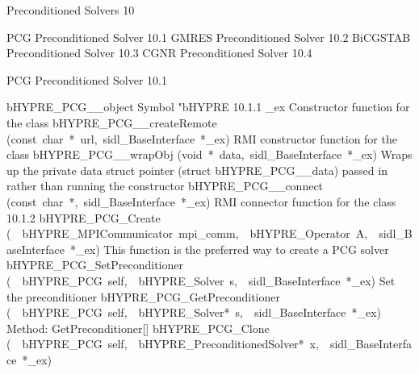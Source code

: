 \documentclass{article}
\begin{document}
\begin{cxxentry}
{}
        {Preconditioned Solvers}
        {}
        {
}
        {10}
\begin{cxxnames}
\cxxitem{}
        {PCG Preconditioned Solver}
        {}
        {
}
        {10.1}
\cxxitem{}
        {GMRES Preconditioned Solver}
        {}
        {
}
        {10.2}
\cxxitem{}
        {BiCGSTAB Preconditioned Solver}
        {}
        {
}
        {10.3}
\cxxitem{}
        {CGNR Preconditioned Solver}
        {}
        {
}
        {10.4}
\end{cxxnames}
\begin{cxxentry}
{}
        {PCG Preconditioned Solver}
        {}
        {
}
        {10.1}
\begin{cxxnames}
        {bHYPRE\_PCG\_\_object}
        {}
        {
Symbol "bHYPRE}
        {10.1.1}
        {\_ex}
        {}
        {
Constructor function for the class}
        {}
\label{cxx.10.1.11}
        {bHYPRE\_PCG\_\_createRemote}
        {(const\ char\ *\ url,\ sidl\_BaseInterface\ *\_ex)}
        {
RMI constructor function for the class}
        {}
\label{cxx.10.1.12}
        {bHYPRE\_PCG\_\_wrapObj}
        {(void\ *\ data,\ sidl\_BaseInterface\ *\_ex)}
        {
Wraps up the private data struct pointer (struct bHYPRE\_PCG\_\_data) passed in rather than running the constructor}
        {}
\label{cxx.10.1.13}
        {bHYPRE\_PCG\_\_connect}
        {(const\ char\ *,\ sidl\_BaseInterface\ *\_ex)}
        {
RMI connector function for the class}
        {10.1.2}
        {bHYPRE\_PCG\_Create}
        {(\ \ bHYPRE\_MPICommunicator\ mpi\_comm,\ \ bHYPRE\_Operator\ A,\ \ sidl\_BaseInterface\ *\_ex)}
        {
This function is the preferred way to create a PCG solver}
        {}
\label{cxx.10.1.14}
        {bHYPRE\_PCG\_SetPreconditioner}
        {(\ \ bHYPRE\_PCG\ self,\ \ bHYPRE\_Solver\ s,\ \ sidl\_BaseInterface\ *\_ex)}
        {
Set the preconditioner}
        {}
\label{cxx.10.1.15}
        {bHYPRE\_PCG\_GetPreconditioner}
        {(\ \ bHYPRE\_PCG\ self,\ \ bHYPRE\_Solver*\ s,\ \ sidl\_BaseInterface\ *\_ex)}
        {
Method:  GetPreconditioner[]}
        {}
\label{cxx.10.1.16}
        {bHYPRE\_PCG\_Clone}
        {(\ \ bHYPRE\_PCG\ self,\ \ bHYPRE\_PreconditionedSolver*\ x,\ \ sidl\_BaseInterface\ *\_ex)}

\end{cxxnames}
\end{cxxentry}
\end{cxxentry}
\end{document}
